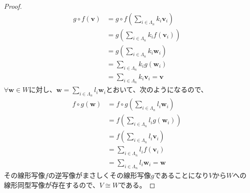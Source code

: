 \documentclass[dvipdfmx]{jsarticle}
\begin{document}
\begin{proof}
\begin{align*}
g \circ f\left( \mathbf{v} \right) &= g \circ f\left( \sum_{i \in \varLambda_{n}} {k_{i}\mathbf{v}_{i}} \right)\\
&= g\left( \sum_{i \in \varLambda_{n}} {k_{i}f\left( \mathbf{v}_{i} \right)} \right)\\
&= g\left( \sum_{i \in \varLambda_{n}} {k_{i}\mathbf{w}_{i}} \right)\\
&= \sum_{i \in \varLambda_{n}} {k_{i}g\left( \mathbf{w}_{i} \right)}\\
&= \sum_{i \in \varLambda_{n}} {k_{i}\mathbf{v}_{i}} = \mathbf{v}
\end{align*}
$\forall\mathbf{w} \in W$に対し、$\mathbf{w} = \sum_{i \in \varLambda_{n}} {l_{i}\mathbf{w}_{i}}$とおいて、次のようになるので、
\begin{align*}
f \circ g\left( \mathbf{w} \right) &= f \circ g\left( \sum_{i \in \varLambda_{n}} {l_{i}\mathbf{w}_{i}} \right)\\
&= f\left( \sum_{i \in \varLambda_{n}} {l_{i}g\left( \mathbf{w}_{i} \right)} \right)\\
&= f\left( \sum_{i \in \varLambda_{n}} {l_{i}\mathbf{v}_{i}} \right)\\
&= \sum_{i \in \varLambda_{n}} {l_{i}f\left( \mathbf{v}_{i} \right)}\\
&= \sum_{i \in \varLambda_{n}} {l_{i}\mathbf{w}_{i}} = \mathbf{w}
\end{align*}
その線形写像$f$の逆写像がまさしくその線形写像$g$であることになり$V$から$W$への線形同型写像が存在するので、$V \cong W$である。
\end{proof}
\end{document}
